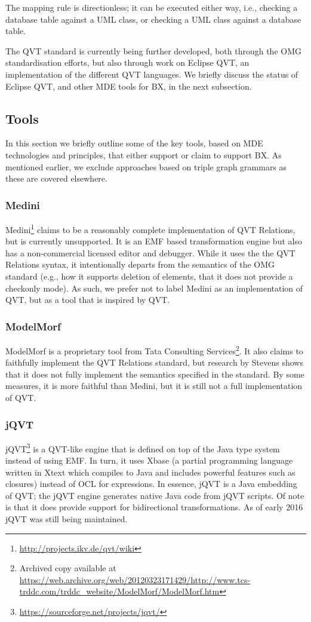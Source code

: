 The mapping rule is directionless; it can be executed either way, i.e., checking a database table against a UML class, or checking a UML class against a database table.

The QVT standard is currently being further developed, both through the OMG standardisation efforts, but also through work on Eclipse QVT, an implementation of the different QVT languages. We briefly discuss the status of Eclipse QVT, and other MDE tools for BX, in the next subsection.

\subsection{Tools}
In this section we briefly outline some of the key tools, based on MDE technologies and principles, that either support or claim to support BX. As mentioned earlier, we exclude approaches based on triple graph grammars as these are covered elsewhere.

\subsubsection{Medini}
Medini\footnote{\url{http://projects.ikv.de/qvt/wiki}} claims to be a reasonably complete implementation of QVT Relations, but is currently unsupported. It is an EMF based transformation engine but also has a non-commercial licensed editor and debugger. While it uses the the QVT Relations syntax, it intentionally departs from the semantics of the OMG standard (e.g., how it supports deletion of elements, that it does not provide a checkonly mode). As such, we prefer not to label Medini as an implementation of QVT, but as a tool that is inspired by QVT.

\subsubsection{ModelMorf}
ModelMorf is a proprietary tool from Tata Consulting Services\footnote{Archived copy available at \url{https://web.archive.org/web/20120323171429/http://www.tcs-trddc.com/trddc_website/ModelMorf/ModelMorf.htm}}. It also claims to faithfully implement the QVT Relations standard, but research by Stevens \cite{Stevens13} shows that it does not fully implement the semantics specified in the standard. By some measures, it is more faithful than Medini, but it is still not a full implementation of QVT.

\subsubsection{jQVT}
jQVT\footnote{\url{https://sourceforge.net/projects/jqvt/}} is a QVT-like engine that is defined on top of the Java type system instead of using EMF. In turn, it uses Xbase (a partial programming language written in Xtext which compiles to Java and includes powerful features such as closures) instead of OCL for expressions. In essence, jQVT is a Java embedding of QVT; the jQVT engine generates native Java code from jQVT scripts. Of note is that it does provide support for bidirectional transformations. As of early 2016 jQVT was still being maintained.

